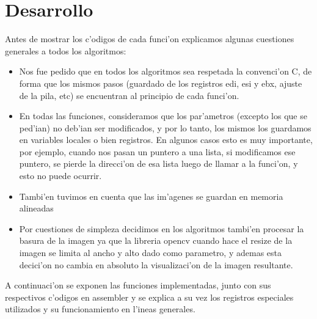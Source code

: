 \documentclass[11pt,a4paper,spanish]{article}
\begin{document}
\section{Desarrollo}
Antes de mostrar los c'odigos de cada funci'on explicamos algunas cuestiones generales a todos los algoritmos:
\begin{itemize}
\item Nos fue pedido que en todos los algoritmos sea respetada la convenci'on C, de forma que los mismos pasos (guardado de los registros edi, esi y ebx, ajuste de la pila, etc) se encuentran al principio de cada funci'on.
\item En todas las funciones, consideramos que los par'ametros (excepto los que se ped'ian) no deb'ian ser modificados, y por lo tanto, los mismos los guardamos en variables locales o bien registros. En algunos casos esto es muy importante, por ejemplo, cuando nos pasan un puntero a una lista, si modificamos ese puntero, se pierde la direcci'on de esa lista luego de llamar a la funci'on, y esto no puede ocurrir.
\item Tambi'en tuvimos en cuenta que las im'agenes se guardan en memoria alineadas
\item Por cuestiones de simpleza decidimos en los algoritmos tambi'en procesar la basura de la imagen ya que la libreria opencv cuando hace el resize de la imagen se limita al ancho y alto dado como parametro, y ademas esta decici'on no cambia en absoluto la visualizaci'on de la imagen resultante.
\end{itemize}

A continuaci'on se exponen las funciones implementadas, junto con sus respectivos c'odigos en assembler y se explica a su vez los registros especiales utilizados y su funcionamiento en l'ineas generales.
\end{document}
